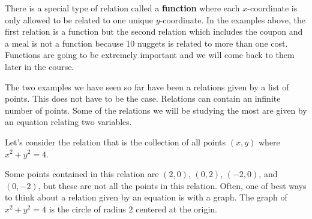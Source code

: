 \documentclass[nooutcomes]{ximera}
\begin{document}
\begin{remark}
There is a special type of relation called a \textbf{function} where each $x$-coordinate is only allowed to be related to one unique $y$-coordinate.  In the examples above, the first relation is a function but the second relation which includes the coupon and a meal is not a function because 10 nuggets is related to more than one cost.  Functions are going to be extremely important and we will come back to them later in the course.
\end{remark}


The two examples we have seen so far have been a relations given by a list of points.  This does not have to be the case.  Relations can contain an infinite number of points.  Some of the relations we will be studying the most are given by an equation relating two variables.

\begin{example}
Let's consider the relation that is the collection of all points $(x,y)$ where $x^2+y^2=4$. 

\begin{explanation}
Some points contained in this relation are $(2,0)$, $(0,2)$, $(-2,0)$, and $(0,-2)$, but these are not all the points in this relation.  Often, one of best ways to think about a relation given by an equation is with a graph.  The graph of $x^2+y^2=4$ is the circle of radius 2 centered at the origin.

\begin{image}
\end{image}

\end{explanation}
\end{example}
\end{document}
